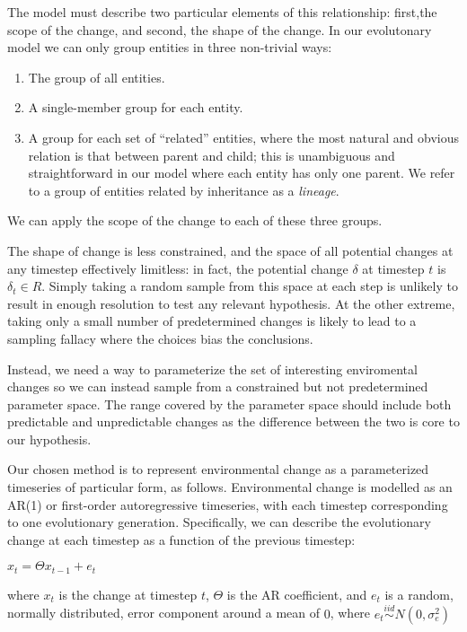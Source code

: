 \documentclass[]{report}
\begin{document}
The model must describe two particular elements of this relationship: first,the scope of the change, and second, the shape of the change. In our evolutonary model we can only group entities in three non-trivial ways:
\begin{enumerate}
	\item The group of all entities.
	\item A single-member group for each entity.
	\item A group for each set of ``related'' entities, where the most natural and obvious relation is that between parent and child; this is unambiguous and straightforward in our model where each entity has only one parent. We refer to a group of entities related by inheritance as a \emph{lineage}.
\end{enumerate}

We can apply the scope of the change to each of these three groups.

The shape of change is less constrained, and the space of all potential changes at any timestep effectively limitless: in fact, the potential change $\delta$ at timestep $t$ is $\delta_t\in R$. Simply taking a random sample from this space at each step is unlikely to result in enough resolution to test any relevant hypothesis. At the other extreme, taking only a small number of predetermined changes is likely to lead to a sampling fallacy where the choices bias the conclusions.

Instead, we need a way to parameterize the set of interesting enviromental changes so we can instead sample from a constrained but not predetermined parameter space. The range covered by the parameter space should include both predictable and unpredictable changes as the difference between the two is core to our hypothesis.

Our chosen method is to represent environmental change as a parameterized timeseries of particular form, as follows. Environmental change is modelled as an AR(1) or first-order autoregressive timeseries, with each timestep corresponding to one evolutionary generation. Specifically, we can describe the evolutionary change at each timestep as a function of the previous timestep:

$x_t = \Theta x_{t-1} + e_t$

where $x_t$ is the change at timestep $t$, $\Theta$ is the AR coefficient, and $e_t$ is a random, normally distributed, error component around a mean of $0$, where $e_t\stackrel{iid}{\sim}N(0,\sigma^{2}_e)$
\end{document}
